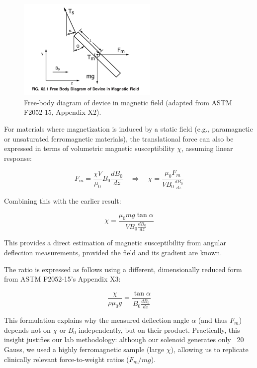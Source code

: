 \begin{figure}[htbp]
	\centering
	\includegraphics[width=0.6\textwidth]{Assests/astm_diagram.png}
	\caption{Free-body diagram of device in magnetic field (adapted from ASTM F2052-15, Appendix X2).}
	\label{fig:astm_diagram}
\end{figure}

For materials where magnetization is induced by a static field (e.g., paramagnetic or unsaturated ferromagnetic materials), the translational force can also be expressed in terms of volumetric magnetic susceptibility $\chi$, assuming linear response:

\begin{equation}
	F_m = \frac{\chi V}{\mu_0} B_0 \frac{dB_0}{dz}
	\quad \Rightarrow \quad
	\chi = \frac{\mu_0 F_m}{V B_0 \frac{dB_0}{dz}}
\end{equation}

Combining this with the earlier result:

\begin{equation}
	\chi = \frac{\mu_0 m g \tan \alpha}{V B_0 \frac{dB_0}{dz}}
\end{equation}

This provides a direct estimation of magnetic susceptibility from angular deflection measurements, provided the field and its gradient are known. 

The ratio is expressed as follows using a different, dimensionally reduced form from ASTM F2052-15's Appendix X3:

\begin{equation}
	\frac{\chi}{\rho \mu_0 g} = \frac{\tan \alpha}{B_0 \frac{dB_0}{dz}}
\end{equation}

This formulation explains why the measured deflection angle $\alpha$ (and thus $F_m$) depends not on $\chi$ or $B_0$ independently, but on their product. Practically, this insight justifies our lab methodology: although our solenoid generates only ~20 Gauss, we used a highly ferromagnetic sample (large $\chi$), allowing us to replicate clinically relevant force-to-weight ratios ($F_m / mg$).

